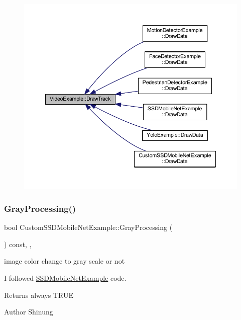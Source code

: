 \begin{figure}[H]
\begin{center}
\leavevmode
\includegraphics[width=350pt]{class_video_example_a84a040bc87b915c5ee18c5d11235f40c_icgraph}
\end{center}
\end{figure}
\mbox{\label{class_custom_s_s_d_mobile_net_example_a4c3fe9ac68b5ef4f51d91a6322c5da02}} 
\subsubsection{\texorpdfstring{Gray\+Processing()}{GrayProcessing()}}
{\footnotesize\ttfamily bool Custom\+S\+S\+D\+Mobile\+Net\+Example\+::\+Gray\+Processing (\begin{DoxyParamCaption}{ }\end{DoxyParamCaption}) const\hspace{0.3cm}{\ttfamily [inline]}, {\ttfamily [protected]}, {\ttfamily [virtual]}}



image color change to gray scale or not 

I followed \mbox{\hyperlink{class_s_s_d_mobile_net_example}{S\+S\+D\+Mobile\+Net\+Example}} code. \begin{DoxyReturn}{Returns}
always T\+R\+UE 
\end{DoxyReturn}
\begin{DoxyAuthor}{Author}
Shinung 
\end{DoxyAuthor}


